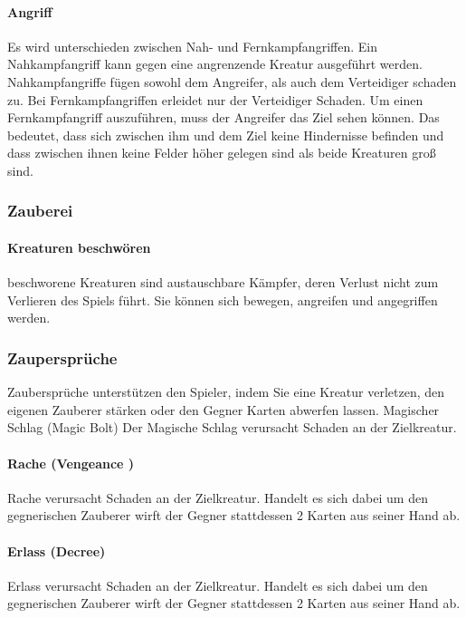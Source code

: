 \documentclass[a4paper,12pt]{scrartcl}
\begin{document}
	\paragraph{Angriff}
	Es wird unterschieden zwischen Nah- und Fernkampfangriffen. 
	Ein Nahkampfangriff kann gegen eine angrenzende Kreatur ausgeführt werden.
	Nahkampfangriffe fügen sowohl dem Angreifer, als auch dem Verteidiger schaden zu.
	Bei Fernkampfangriffen erleidet nur der Verteidiger Schaden.
	Um einen Fernkampfangriff auszuführen, muss der Angreifer das Ziel sehen können. Das bedeutet, dass sich zwischen ihm und dem Ziel keine Hindernisse befinden und dass zwischen ihnen keine Felder höher gelegen sind als beide Kreaturen groß sind.
	
	\subsubsection{Zauberei}
	\paragraph{Kreaturen beschwören}
	beschworene Kreaturen sind austauschbare Kämpfer, deren Verlust nicht zum Verlieren des Spiels führt. Sie können sich bewegen, angreifen und angegriffen werden.
	
	\subsubsection{Zaupersprüche}
	Zaubersprüche unterstützen den Spieler, indem Sie eine Kreatur verletzen, den eigenen Zauberer stärken oder den Gegner Karten abwerfen lassen.
	Magischer Schlag (\glqq Magic Bolt\grqq\hspace{0.05em})
	Der Magische Schlag verursacht Schaden an der Zielkreatur. 
	
	\paragraph{Rache (\glqq Vengeance \grqq\hspace{0.05em})}
	Rache verursacht Schaden an der Zielkreatur. Handelt es sich dabei um den gegnerischen Zauberer wirft der Gegner stattdessen 2 Karten aus seiner Hand ab.
	
	\paragraph{Erlass (\glqq Decree\grqq\hspace{0.05em})}
	Erlass verursacht Schaden an der Zielkreatur. Handelt es sich dabei um den gegnerischen Zauberer wirft der Gegner stattdessen 2 Karten aus seiner Hand ab.
	
\end{document}
